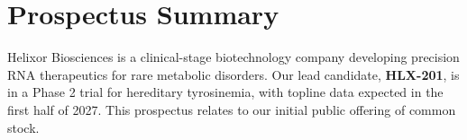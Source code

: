 \section{Prospectus Summary}
Helixor Biosciences is a clinical-stage biotechnology company developing precision RNA
therapeutics for rare metabolic disorders. Our lead candidate, \textbf{HLX-201}, is in a
Phase 2 trial for hereditary tyrosinemia, with topline data expected in the first half of
2027. This prospectus relates to our initial public offering of common stock.
